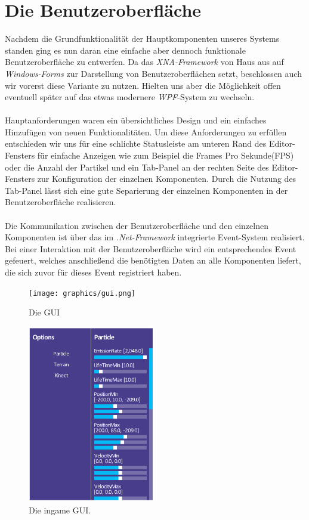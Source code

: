 \section{Die Benutzeroberfläche}
\begin{Spacing}{\mylinespace}

Nachdem die Grundfunktionalität der Hauptkomponenten unseres Systems standen ging es nun daran eine einfache aber dennoch funktionale Benutzeroberfläche zu entwerfen. Da das \textit{XNA-Framework} von Haus aus auf \textit{Windows-Forms} zur Darstellung von Benutzeroberflächen setzt, beschlossen auch wir vorerst diese Variante zu nutzen. Hielten uns aber die Möglichkeit offen eventuell später auf das etwas modernere \textit{WPF}-System zu wechseln.
\\\\
Hauptanforderungen waren ein übersichtliches Design und ein einfaches Hinzufügen von neuen Funktionalitäten. Um diese Anforderungen zu erfüllen entschieden wir uns für eine schlichte Statusleiste am unteren Rand des Editor-Fensters für einfache Anzeigen wie zum Beispiel die Frames Pro Sekunde(FPS) oder die Anzahl der Partikel und ein Tab-Panel an der rechten Seite des Editor-Fensters zur Konfiguration der einzelnen Komponenten. Durch die Nutzung des Tab-Panel lässt sich eine gute Separierung der einzelnen Komponenten in der Benutzeroberfläche realisieren. 
\\\\
Die Kommunikation zwischen der Benutzeroberfläche und den einzelnen Komponenten ist über das im \textit{.Net-Framework} integrierte Event-System realisiert. Bei einer Interaktion mit der Benutzeroberfläche wird ein entsprechendes Event gefeuert, welches anschließend die benötigten Daten an alle Komponenten liefert, die sich zuvor für dieses Event registriert haben.  

\begin{figure}[h!]
	\vspace*{30px}
	\texttt{[image: graphics/gui.png]}	
	\caption{Die GUI}
	\label{fig:GUI}
\end{figure}

\end{Spacing}
\newpage

\begin{figure}[h!]
	\centering
	\vspace*{30px}
	\includegraphics[width=210px]{graphics/newGui.png}
	\caption{Die ingame GUI.}
	\label{fig:NewGUI}
\end{figure}

